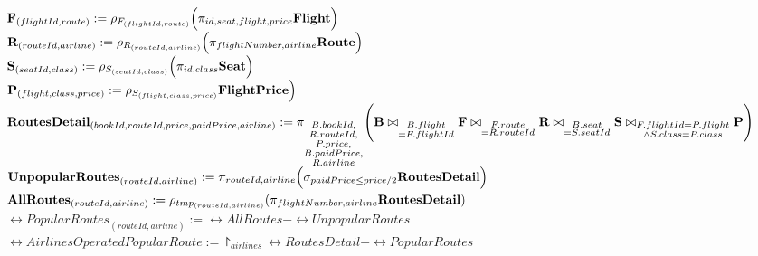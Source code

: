 \begin{enumerate}[label=\textbf{\arabic*.}]
$\textbf{F}_{(flightId, route)} := \rho_{F_{(flightId, route)}} \Big( \pi_{id, seat, flight, price} \textbf{Flight} \Big)$\\

$\textbf{R}_{(routeId, airline)} := \rho_{R_{(routeId, airline)}} \Big( \pi_{flightNumber, airline} \textbf{Route} \Big)$\\

$\textbf{S}_{(seatId, class)} := \rho_{S_{(seatId, class)}} \Big( \pi_{id, class} \textbf{Seat} \Big)$\\

$\textbf{P}_{(flight, class, price)} := \rho_{S_{(flight, class, price)}} \textbf{FlightPrice} \Big)$\\

$\textbf{RoutesDetail}_{(bookId, routeId, price, paidPrice, airline)}\\
:= \pi_{\substack{B.bookId, \\ R.routeId, \\ P.price, \\ B.paidPrice, \\ R.airline}} \Bigg( \textbf{B} \bowtie_{\substack{B.flight\\ = F.flightId}} \textbf{F} \bowtie_{\substack{F.route\\ = R.routeId}} \textbf{R} \bowtie_{\substack{B.seat \\ = S.seatId}} \textbf{S} \bowtie_{\substack{F.flightId = P.flight \\ \land S.class = P.class}} \textbf{P} \Bigg)$\\

$\textbf{UnpopularRoutes}_{(routeId, airline)} := \pi_{routeId, airline} \Big( \sigma_{paidPrice \leq price / 2} \textbf{RoutesDetail} \Big)$\\

$\textbf{AllRoutes}_{(routeId, airline)} := \rho_{tmp_{(routeId, airline)}}(\pi_{flightNumber, airline} \textbf{RoutesDetail})$\\

$\rel{PopularRoutes}_{(routeId, airline)} := \rel{AllRoutes} - \rel{UnpopularRoutes}$\\

$\rel{AirlinesOperatedPopularRoute} := \project_{airlines} \rel{RoutesDetail} - \rel{PopularRoutes}$

\end{enumerate}